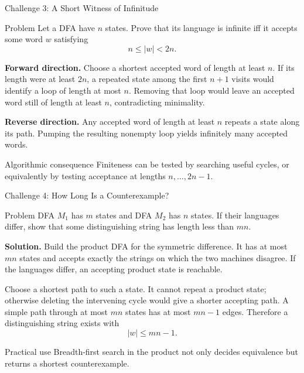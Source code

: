 \documentclass[10pt]{beamer}
\begin{document}
\begin{frame}{Challenge 3: A Short Witness of Infinitude}
  \small
  \begin{block}{Problem}
    Let a DFA have $n$ states. Prove that its language is infinite iff it
    accepts some word $w$ satisfying
    \[
      n\le |w|<2n.
    \]
  \end{block}
  \textbf{Forward direction.}
  Choose a shortest accepted word of length at least $n$. If its length were
  at least $2n$, a repeated state among the first $n+1$ visits would identify
  a loop of length at most $n$. Removing that loop would leave an accepted
  word still of length at least $n$, contradicting minimality.

  \textbf{Reverse direction.}
  Any accepted word of length at least $n$ repeats a state along its path.
  Pumping the resulting nonempty loop yields infinitely many accepted words.
  \begin{block}{Algorithmic consequence}
    Finiteness can be tested by searching useful cycles, or equivalently by
    testing acceptance at lengths $n,\ldots,2n-1$.
  \end{block}
\end{frame}

\begin{frame}{Challenge 4: How Long Is a Counterexample?}
  \small
  \begin{block}{Problem}
    DFA $M_1$ has $m$ states and DFA $M_2$ has $n$ states. If their languages
    differ, show that some distinguishing string has length less than $mn$.
  \end{block}
  \textbf{Solution.}
  Build the product DFA for the symmetric difference. It has at most $mn$
  states and accepts exactly the strings on which the two machines disagree.
  If the languages differ, an accepting product state is reachable.

  Choose a shortest path to such a state. It cannot repeat a product state;
  otherwise deleting the intervening cycle would give a shorter accepting
  path. A simple path through at most $mn$ states has at most $mn-1$ edges.
  Therefore a distinguishing string exists with
  \[
    |w|\le mn-1.
  \]
  \begin{exampleblock}{Practical use}
    Breadth-first search in the product not only decides equivalence but
    returns a shortest counterexample.
  \end{exampleblock}
\end{frame}
\end{document}
